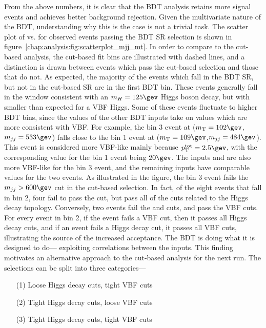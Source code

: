 From the above numbers, it is clear that the BDT analysis retains more
signal events and achieves better background rejection. Given the
multivariate nature of the BDT, understanding why this is the case is
not a trivial task. The scatter plot of \mjj vs. \mT for
observed events passing the BDT SR selection is shown in
figure~\ref{chap:analysis:fig:scatterplot_mjj_mt}. In order to compare
to the cut-based analysis, the cut-based fit bins are illustrated with
dashed lines, and a distinction is drawn between events which pass the
cut-based selection and those that do not. As expected, the majority
of the events which fall in the BDT SR, but not in the cut-based SR are
in the first BDT bin. These events generally fall in the \mT window
consistent with an $m_H = 125 \gev$ Higgs boson decay, but with \mjj
smaller than expected for a VBF Higgs. Some of these events fluctuate
to higher BDT bins, since the values of the other BDT inputs take on
values which are more consistent with VBF. For example, the bin 3 event at ($\mT = 102
\gev$,$\mjj = 533 \gev$) falls close to the bin 1 event at ($\mT = 109
\gev$,$\mjj = 484 \gev$). This event is considered more VBF-like
mainly because $\pTtot = 2.5 \gev$, with the corresponding value for
the bin 1 event being $20 \gev$. The inputs \dphill and \mll are also
more VBF-like for the bin 3 event, and the remaining inputs have
comparable values for the two events. As illustrated in the figure,
the bin 3 event fails the $\mjj > 600 \gev$ cut in the cut-based
selection. In fact, of the eight events that fall in bin 2, four fail
to pass the \mjj cut, but pass all of the cuts related to the Higgs
decay topology. Conversely, two events fail the \mll and \dphill cuts,
and pass the VBF cuts. For every event in bin 2, if the event fails a
VBF cut, then it passes all Higgs decay cuts, and if an event fails a
Higgs decay cut, it passes all VBF cuts, illustrating the source of
the increased acceptance. The BDT is doing what it is designed to do---
exploiting correlations between the inputs. This finding motivates an
alternative approach to the cut-based analysis for the next
run. The selections can be split into three categories---

\begin{enumerate}[nolistsep]
\item[(1)] Loose Higgs decay cuts, tight VBF cuts
\item[(2)] Tight Higgs decay cuts, loose VBF cuts
\item[(3)] Tight Higgs decay cuts, tight VBF cuts
\end{enumerate}

